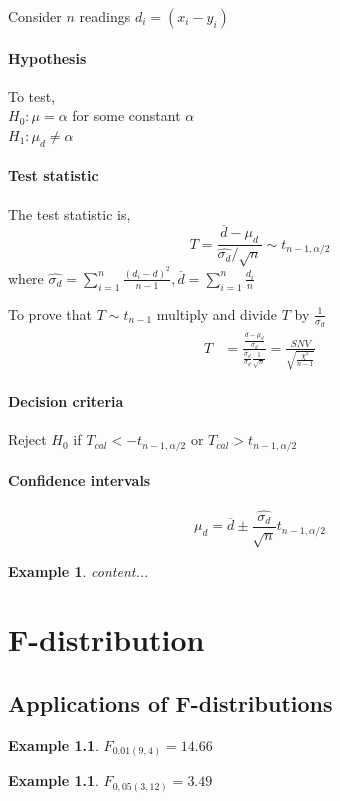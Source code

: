 \documentclass[oneside,11pt,pdftex]{book}%
\numberwithin{equation}{section}
\newtheorem{example}[theorem]{Example}
\numberwithin{section}{chapter}
\numberwithin{equation}{chapter}
\begin{document}
Consider $ n $ readings $ d_i=(x_i-y_i) $

\subsubsection{Hypothesis}
To test,\\
$ H_0: \mu= \alpha  $ for some constant $ \alpha  $\\
$ H_1: \mu_d \neq \alpha $

\subsubsection{Test statistic}
The test statistic is,
\[ T=\frac{\overline{d}-\mu_d }{\hat{\sigma_d}/\sqrt{n}} \sim t_{n-1,\alpha/2}\]
where $ \hat{\sigma_d}= \sum_{i=1}^n \frac{(d_i-d)^2}{n-1}, \overline{d}=\sum_{i=1}^n \frac{d_i}{n}$

To prove that $ T \sim t_{n-1} $
multiply and divide $ T $ by $ \frac{1}{\sigma_d} $
\begin{align*}
	T&=\frac{\frac{\overline{d}-\mu_d }{\sigma_d}}{\frac{\hat{\sigma}_d}{\sigma_d}\frac{1}{\sqrt{n}}}=\frac{SNV}{\sqrt{\frac{\chi^2}{n-1}}}
\end{align*}

\subsubsection{Decision criteria}
Reject $ H_0 $ if $ T_{cal} < -t_{n-1,\alpha/2}$ or $ T_{cal} >t_{n-1,\alpha/2}$
\subsubsection{Confidence intervals}
\[ \mu_d=\overline{d} \pm \frac{\hat{\sigma_d}}{\sqrt{n}}t_{n-1,\alpha/2}\]

\begin{example}
	content...
\end{example}


\chapter{F-distribution}

\section{Applications of F-distributions}
\begin{example}
	$ F_{0.01(9,4)} =14.66$
\end{example}
\begin{example}
	$ F_{0,05 (3,12)}=3.49 $
\end{example}
\end{document}
